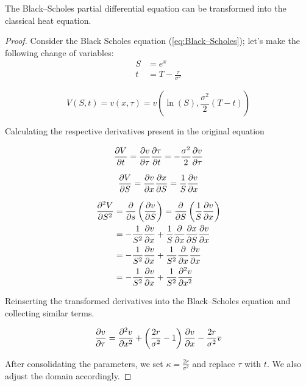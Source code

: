 The Black–Scholes partial differential equation can be transformed into the classical heat equation.
\begin{proof}
    Consider the Black Scholes equation (\ref{eq:Black–Scholes}); let's make the following change of variables:
    \begin{align*}
        S &= e^{x} \\
        t &= T - \frac{\tau}{\sigma^2}
    \end{align*}
    
    \begin{equation*}
        V(S,t) = v(x,\tau) = v\!\left(\ln(S), \frac{\sigma^2}{2}(T - t)\right)
    \end{equation*}

    Calculating the respective derivatives present in the original equation
    
    \begin{equation*}
        \pdv{V}{t} = \pdv{v}{\tau} \pdv{\tau}{t} 
        = -\frac{\sigma^2}{2} \pdv{v}{\tau}
    \end{equation*}
    
    \begin{equation*}
        \pdv{V}{S} = \pdv{v}{x} \pdv{x}{S} 
        =  \frac{1}{S} \pdv{v}{x}
    \end{equation*}
    
    \begin{align*}
        \pdv[2]{V}{S} &= \pdv{s} \left( \pdv{v}{S} \right) = \pdv{S} \left( \frac{1}{S} \pdv{v}{x} \right) \\
        &= -\frac{1}{S^2}\pdv{v}{x} + \frac{1}{S} \pdv{}{x} \pdv{x}{S} \pdv{v}{x} \\
        &= -\frac{1}{S^2}\pdv{v}{x} + \frac{1}{S^2} \pdv{}{x} \pdv{v}{x} \\
        &= -\frac{1}{S^2}\pdv{v}{x} + \frac{1}{S^2}\pdv[2]{v}{x}
    \end{align*}
    
    Reinserting the transformed derivatives into the Black–Scholes equation and collecting similar terms.
    
    \begin{equation*}
        \pdv{v}{\tau} = \pdv[2]{v}{x} + \left(\frac{2r}{\sigma^2} - 1 \right)\pdv{v}{x} - \frac{2r}{\sigma^2} v
    \end{equation*}

    After consolidating the parameters, we set $\kappa = \tfrac{2r}{\sigma^{2}}$ and replace $\tau$ with $t$. We also adjust the domain accordingly.
    

\end{proof}
